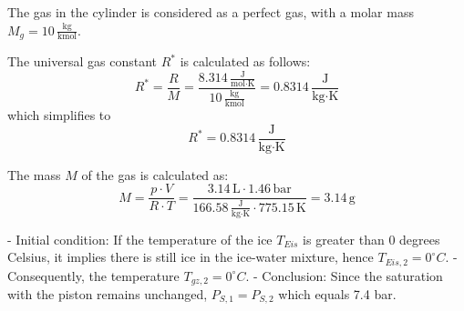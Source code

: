 The gas in the cylinder is considered as a perfect gas, with a molar mass \( M_g = 10 \, \frac{\text{kg}}{\text{kmol}} \).

The universal gas constant \( R^* \) is calculated as follows:
\[
R^* = \frac{R}{M} = \frac{8.314 \, \frac{\text{J}}{\text{mol} \cdot \text{K}}}{10 \, \frac{\text{kg}}{\text{kmol}}} = 0.8314 \, \frac{\text{J}}{\text{kg} \cdot \text{K}}
\]
which simplifies to
\[
R^* = 0.8314 \, \frac{\text{J}}{\text{kg} \cdot \text{K}}
\]

The mass \( M \) of the gas is calculated as:
\[
M = \frac{p \cdot V}{R \cdot T} = \frac{3.14 \, \text{L} \cdot 1.46 \, \text{bar}}{166.58 \, \frac{\text{J}}{\text{kg} \cdot \text{K}} \cdot 775.15 \, \text{K}} = 3.14 \, \text{g}
\]

- Initial condition: If the temperature of the ice \( T_{Eis} \) is greater than 0 degrees Celsius, it implies there is still ice in the ice-water mixture, hence \( T_{Eis,2} = 0^\circ C \).
- Consequently, the temperature \( T_{gz,2} = 0^\circ C \).
- Conclusion: Since the saturation with the piston remains unchanged, \( P_{S,1} = P_{S,2} \) which equals 7.4 bar.